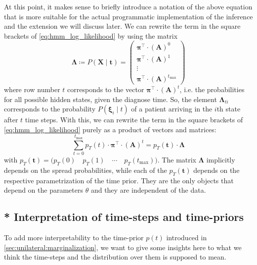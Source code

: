 \documentclass[\relativeRoot/main.tex]{subfiles}
\begin{document}
At this point, it makes sense to briefly introduce a notation of the above equation that is more suitable for the actual programmatic implementation of the inference and the extension we will discuss later. We can rewrite the term in the square brackets of \cref{eq:hmm_log_likelihood} by using the matrix
%
\begin{equation} \label{eq:hmm_matrix_lambda}
    \boldsymbol{\Lambda} \coloneqq 
    P \left( \mathbf{X} \mid \mathbf{t} \right) = 
    \begin{pmatrix}
        \boldsymbol{\pi}^\top \cdot \left( \mathbf{A} \right)^0 \\
        \boldsymbol{\pi}^\top \cdot \left( \mathbf{A} \right)^1 \\
        \vdots \\
        \boldsymbol{\pi}^\top \cdot \left( \mathbf{A} \right)^{t_\text{max}}
    \end{pmatrix}
\end{equation}
%
where row number $t$ corresponds to the vector $\boldsymbol{\pi}^\top \cdot \left( \mathbf{A} \right)^t$, i.e. the probabilities for all possible hidden states, given the diagnose time. So, the element $\boldsymbol{\Lambda}_{ti}$ corresponds to the probability $P \left( \boldsymbol{\xi}_i \mid t \right)$ of a patient arriving in the $i$th state after $t$ time steps. With this, we can rewrite the term in the square brackets of \cref{eq:hmm_log_likelihood} purely as a product of vectors and matrices:
%
\begin{equation}
    \sum_{t = 0}^{t_\text{max}}{p_T (t) \cdot \boldsymbol{\pi}^\top \cdot (\mathbf{A})^t} = p_T \left( \mathbf{t} \right) \cdot \boldsymbol{\Lambda}
\end{equation}
%
with $p_T \left( \mathbf{t} \right) = \big( p_T(0) \quad p_T(1) \quad \cdots \quad p_T(t_\text{max}) \big)$. The matrix $\boldsymbol{\Lambda}$ implicitly depends on the spread probabilities, while each of the $p_T(\mathbf{t})$ depends on the respective parametrization of the time prior. They are the only objects that depend on the parameters $\theta$ and they are independent of the data.


\subsection*{* Interpretation of time-steps and time-priors}
\label{subsec:unilateral:tstage:interpretation}

To add more interpretability to the time-prior $p(t)$ introduced in \cref{sec:unilateral:marginalization}, we want to give some insights here to what we think the time-steps and the distribution over them is supposed to mean.
\end{document}
